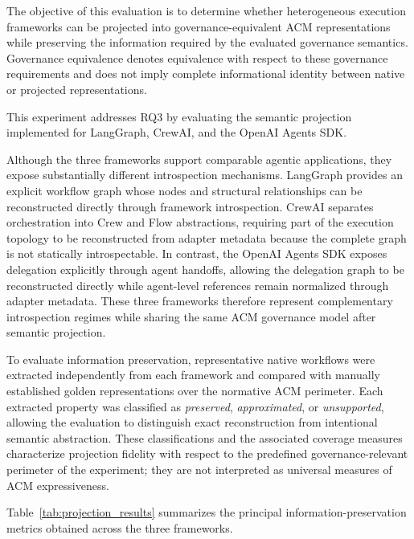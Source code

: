 \documentclass[10pt]{article}
\begin{document}
The objective of this evaluation is to determine whether heterogeneous execution frameworks can be projected into governance-equivalent ACM representations while preserving the information required by the evaluated governance semantics. Governance equivalence denotes equivalence with respect to these governance requirements and does not imply complete informational identity between native or projected representations.

This experiment addresses RQ3 by evaluating the semantic projection implemented for LangGraph, CrewAI, and the OpenAI Agents SDK.

Although the three frameworks support comparable agentic applications, they expose substantially different introspection mechanisms. LangGraph provides an explicit workflow graph whose nodes and structural relationships can be reconstructed directly through framework introspection. CrewAI separates orchestration into Crew and Flow abstractions, requiring part of the execution topology to be reconstructed from adapter metadata because the complete graph is not statically introspectable. In contrast, the OpenAI Agents SDK exposes delegation explicitly through agent handoffs, allowing the delegation graph to be reconstructed directly while agent-level references remain normalized through adapter metadata. These three frameworks therefore represent complementary introspection regimes while sharing the same ACM governance model after semantic projection.

To evaluate information preservation, representative native workflows were extracted independently from each framework and compared with manually established golden representations over the normative ACM perimeter. Each extracted property was classified as \emph{preserved}, \emph{approximated}, or \emph{unsupported}, allowing the evaluation to distinguish exact reconstruction from intentional semantic abstraction.
These classifications and the associated coverage measures characterize projection fidelity with respect to the predefined governance-relevant perimeter of the experiment; they are not interpreted as universal measures of ACM expressiveness.

Table~\ref{tab:projection_results} summarizes the principal information-preservation metrics obtained across the three frameworks.
\end{document}
